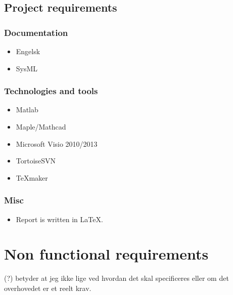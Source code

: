 \subsection{Project requirements}

\subsubsection{Documentation}
\begin{itemize}
\item Engelsk
\item SysML
\end{itemize}

\subsubsection{Technologies and tools}
\begin{itemize}
\item Matlab
\item Maple/Mathcad
\item Microsoft Visio 2010/2013
\item TortoiseSVN
\item TeXmaker
\end{itemize}

\subsubsection{Misc}
\begin{itemize}
\item Report is written in LaTeX.
\end{itemize}

\section{Non functional requirements}
(?) betyder at jeg ikke lige ved hvordan det skal specificeres eller om det overhovedet er et reelt krav.\\
